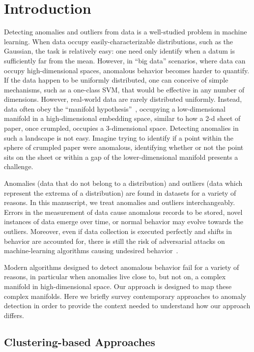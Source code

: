 \section{Introduction}
\label{sec:introduction}

Detecting anomalies and outliers from data is a well-studied problem in machine learning.
When data occupy easily-characterizable distributions, such as the Gaussian, the task is relatively easy:
one need only identify when a datum is sufficiently far from the mean.
However, in ``big data'' scenarios, where data can occupy high-dimensional spaces, anomalous behavior becomes harder to quantify.
If the data happen to be uniformly distributed, one can conceive of simple mechanisms, such as a one-class SVM, that would be effective in any number of dimensions.
However, real-world data are rarely distributed uniformly.
Instead, data often obey the ``manifold hypothesis''~\cite{fefferman2016testing}, occupying a low-dimensional manifold in a high-dimensional embedding space, similar to how a 2-d sheet of paper, once crumpled, occupies a 3-dimensional space.
Detecting anomalies in such a landscape is not easy.
Imagine trying to identify if a point within the sphere of crumpled paper were anomalous, identifying whether or not the point sits on the sheet or within a gap of the lower-dimensional manifold presents a challenge.

Anomalies (data that do not belong to a distribution) and outliers (data which represent the extrema of a distribution) are found in datasets for a variety of reasons.
In this manuscript, we treat anomalies and outliers interchangeably.
Errors in the measurement of data cause anomalous records to be stored,
novel instances of data emerge over time,
or normal behavior may evolve towards the outliers.
Moreover, even if data collection is executed perfectly and shifts in behavior are accounted for, there is still the risk of adversarial attacks on machine-learning algorithms causing undesired behavior~\cite{elsayed2018adversarial}.

Modern algorithms designed to detect anomalous behavior fail for a variety of reasons, in particular when anomalies live close to, but not on, a complex manifold in high-dimensional space.
Our approach is designed to map these complex manifolds.
Here we briefly survey contemporary approaches to anomaly detection in order to provide the context needed to understand how our approach differs.

\subsection{Clustering-based Approaches}
\label{subsec:introduction:clustering-based-approaches}

